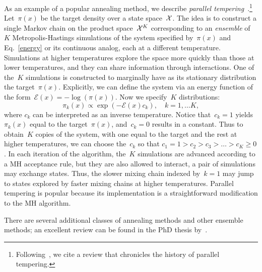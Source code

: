 \documentclass[angelino.tex]{subfiles}
\begin{document}

As an example of a popular annealing method, we describe
\emph{parallel tempering}~\citep{iba:2001-ensemble}.\footnote{Following~\citet{murray-2007-thesis}, we cite a review that chronicles
the history of parallel tempering.}
Let~$\pi(x)$ be the target density over a state space~${\mathcal X}$.
The idea is to construct a single Markov chain on the product space~${\mathcal X}^K$
corresponding to an \emph{ensemble} of~$K$ Metropolis-Hastings
simulations of the system specified by~$\pi(x)$ and Eq.~\ref{energy} or its 
continuous analog, each at a different temperature.
Simulations at higher temperatures explore the space more quickly than those
at lower temperatures, and they can share information through interactions.
One of the~$K$ simulations is constructed to marginally have as its stationary 
distribution the target~$\pi(x)$.
Explicitly, we can define the system via an energy function of the
form~${\mathcal{E}(x) = -\log(\pi(x))}$.
Now we specify~$K$ distributions:
\[
\pi_k(x) \propto \exp(-\mathcal{E}(x) c_k), \quad k = 1, \dots K,
\]
where $c_k$ can be interpreted as an inverse temperature.
Notice that~$c_k = 1$ yields~$\pi_k(x)$ equal to the target~$\pi(x)$,
and~$c_k = 0$ results in a constant.
Thus to obtain~$K$ copies of the system, with one equal to the target and
the rest at higher temperatures, we can choose the~$c_k$ so that
${c_1 = 1 > c_2 > c_3 > \dots > c_K \ge 0}$.
In each iteration of the algorithm, the~$K$ simulations are advanced according
to a MH acceptance rule, but they are also allowed to interact,
\eg a pair of simulations may exchange states.
Thus, the slower mixing chain indexed by~$k=1$ may jump to
states explored by faster mixing chains at higher temperatures.
Parallel tempering is popular because its implementation is a straightforward
modification to the MH algorithm.

There are several additional classes of annealing methods and
other ensemble methods; an excellent review can be found in the PhD thesis 
by~\citet{murray-2007-thesis}.


\end{document}
